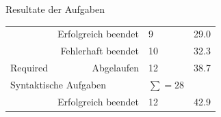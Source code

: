 \documentclass[10pt]{beamer}
\begin{document}
\begin{frame}{Resultate der Aufgaben}
{\begin{tabular}{r r l l}
			\midrule
			
			\multicolumn{1}{l}{\cellcolor[rgb]{ .878,  .878,  .878}} &
			\multicolumn{1}{r}{\multirow{1}[1]{*}{\cellcolor[rgb]{ 1,  1,  1} \textcolor[rgb]{ .004,  .008,  .02}{Erfolgreich beendet}}} &
			\multicolumn{1}{l}{\multirow{1}[1]{*}{\cellcolor[rgb]{ 1,  1,  1} \textcolor[rgb]{ .004,  .008,  .02}{9}}} &
			\multicolumn{1}{l}{\multirow{1}[1]{*}{\cellcolor[rgb]{ 1,  1,  1} \textcolor[rgb]{ .004,  .008,  .02}{29.0}}}\\     
			
			\multicolumn{1}{l}{\cellcolor[rgb]{ .878,  .878,  .878}} &
			\multicolumn{1}{r}{\multirow{1}[1]{*}{\cellcolor[rgb]{ 1,  1,  1} \textcolor[rgb]{ .004,  .008,  .02}{Fehlerhaft beendet}}} &
			\multicolumn{1}{l}{\multirow{1}[1]{*}{\cellcolor[rgb]{ 1,  1,  1} \textcolor[rgb]{ .004,  .008,  .02}{10}}} &
			\multicolumn{1}{l}{\multirow{1}[1]{*}{\cellcolor[rgb]{ 1,  1,  1} \textcolor[rgb]{ .004,  .008,  .02}{32.3}}} \\
			
			\multicolumn{1}{l}{\multirow{-3}[1]{*}{\cellcolor[rgb]{ .878,  .878,  .878}\rule{0pt}{15pt} \textcolor[rgb]{ .149,  .29,  .376}{Required}}} &
			\multicolumn{1}{r}{\multirow{1}[1]{*}{\cellcolor[rgb]{ 1,  1,  1} \textcolor[rgb]{ .004,  .008,  .02}{Abgelaufen}}} &
			\multicolumn{1}{l}{\multirow{1}[1]{*}{\cellcolor[rgb]{ 1,  1,  1} \textcolor[rgb]{ .004,  .008,  .02}{12}}} &
			\multicolumn{1}{l}{\multirow{1}[1]{*}{\cellcolor[rgb]{ 1,  1,  1} \textcolor[rgb]{ .004,  .008,  .02}{38.7}}} \\
			
			\bottomrule
			
			\multicolumn{2}{l}{\multirow{2}[1]{*}{Syntaktische Aufgaben}} &
			\multicolumn{1}{c}{\multirow{2}[1]{*}{$\sum = 28$}} &
			\multicolumn{1}{c}{} \\
			
			\multicolumn{2}{l}{{}} &
			\multicolumn{1}{c}{} &
			\multicolumn{1}{c}{} \\
			
			\toprule
			
			\multicolumn{1}{l}{\cellcolor[rgb]{ .878,  .878,  .878}} &
			\multicolumn{1}{r}{\multirow{1}[1]{*}{\cellcolor[rgb]{ 1,  1,  1} \textcolor[rgb]{ .004,  .008,  .02}{Erfolgreich beendet}}} &
			\multicolumn{1}{l}{\multirow{1}[1]{*}{\cellcolor[rgb]{ 1,  1,  1} \textcolor[rgb]{ .004,  .008,  .02}{12}}} &
			\multicolumn{1}{l}{\multirow{1}[1]{*}{\cellcolor[rgb]{ 1,  1,  1} \textcolor[rgb]{ .004,  .008,  .02}{42.9}}}\\     
			

\end{tabular}}
\end{frame}
\end{document}
